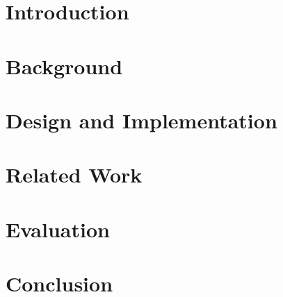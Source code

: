 \documentclass[12pt,a4paper]{report}
\begin{document}



\blankpage



\afterpage{\blankpage}



\afterpage{\blankpage}

\tableofcontents
\listoffigures

\clearpage


\chapter{Introduction}

\chapter{Background}



\chapter{Design and Implementation}

\chapter{Related Work}

\chapter{Evaluation}

\chapter{Conclusion}

\printbibliography
\end{document}
